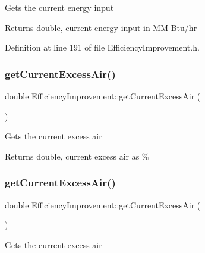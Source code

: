 Gets the current energy input

\begin{DoxyReturn}{Returns}
double, current energy input in MM Btu/hr 
\end{DoxyReturn}


Definition at line 191 of file Efficiency\+Improvement.\+h.

\mbox{\label{class_efficiency_improvement_a42cd83e1c57f065077e31f21b3552a76}} 
\subsubsection{\texorpdfstring{get\+Current\+Excess\+Air()}{getCurrentExcessAir()}\hspace{0.1cm}{\footnotesize\ttfamily [1/3]}}
{\footnotesize\ttfamily double Efficiency\+Improvement\+::get\+Current\+Excess\+Air (\begin{DoxyParamCaption}{ }\end{DoxyParamCaption})}

Gets the current excess air

\begin{DoxyReturn}{Returns}
double, current excess air as \% 
\end{DoxyReturn}
\mbox{\label{class_efficiency_improvement_a42cd83e1c57f065077e31f21b3552a76}} 
\subsubsection{\texorpdfstring{get\+Current\+Excess\+Air()}{getCurrentExcessAir()}\hspace{0.1cm}{\footnotesize\ttfamily [2/3]}}
{\footnotesize\ttfamily double Efficiency\+Improvement\+::get\+Current\+Excess\+Air (\begin{DoxyParamCaption}{ }\end{DoxyParamCaption})}

Gets the current excess air

